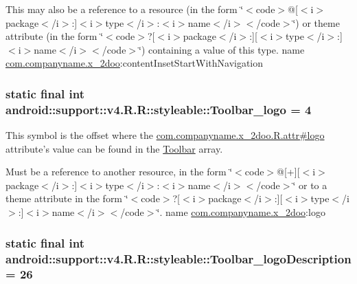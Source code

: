 This may also be a reference to a resource (in the form \char`\"{}$<$code$>$@\mbox{[}$<$i$>$package$<$/i$>$:\mbox{]}$<$i$>$type$<$/i$>$:$<$i$>$name$<$/i$>$$<$/code$>$\char`\"{}) or theme attribute (in the form \char`\"{}$<$code$>$?\mbox{[}$<$i$>$package$<$/i$>$:\mbox{]}\mbox{[}$<$i$>$type$<$/i$>$:\mbox{]}$<$i$>$name$<$/i$>$$<$/code$>$\char`\"{}) containing a value of this type.  name \hyperlink{namespacecom_1_1companyname_1_1x__2doo}{com.companyname.x\_\-2doo}:contentInsetStartWithNavigation \hypertarget{classandroid_1_1support_1_1v4_1_1_r_1_1styleable_f2d9f9e988308a57d3c026af6b7fbbed}{
\subsubsection[{Toolbar\_\-logo}]{\setlength{\rightskip}{0pt plus 5cm}static final int android::support::v4.R.R::styleable::Toolbar\_\-logo = 4}}
\label{classandroid_1_1support_1_1v4_1_1_r_1_1styleable_f2d9f9e988308a57d3c026af6b7fbbed}


This symbol is the offset where the \hyperlink{classcom_1_1companyname_1_1x__2doo_1_1_r_1_1attr_65ce28e23e047ab5f1cd39aeb8daa20c}{com.companyname.x\_\-2doo.R.attr\#logo} attribute's value can be found in the \hyperlink{classandroid_1_1support_1_1v4_1_1_r_1_1styleable_0646d71cfbd4a8645c7d805b33e1c574}{Toolbar} array.

Must be a reference to another resource, in the form \char`\"{}$<$code$>$@\mbox{[}+\mbox{]}\mbox{[}$<$i$>$package$<$/i$>$:\mbox{]}$<$i$>$type$<$/i$>$:$<$i$>$name$<$/i$>$$<$/code$>$\char`\"{} or to a theme attribute in the form \char`\"{}$<$code$>$?\mbox{[}$<$i$>$package$<$/i$>$:\mbox{]}\mbox{[}$<$i$>$type$<$/i$>$:\mbox{]}$<$i$>$name$<$/i$>$$<$/code$>$\char`\"{}.  name \hyperlink{namespacecom_1_1companyname_1_1x__2doo}{com.companyname.x\_\-2doo}:logo \hypertarget{classandroid_1_1support_1_1v4_1_1_r_1_1styleable_511de55d75e2413a6ebdeee92758f44f}{
\subsubsection[{Toolbar\_\-logoDescription}]{\setlength{\rightskip}{0pt plus 5cm}static final int android::support::v4.R.R::styleable::Toolbar\_\-logoDescription = 26}}
\label{classandroid_1_1support_1_1v4_1_1_r_1_1styleable_511de55d75e2413a6ebdeee92758f44f}


